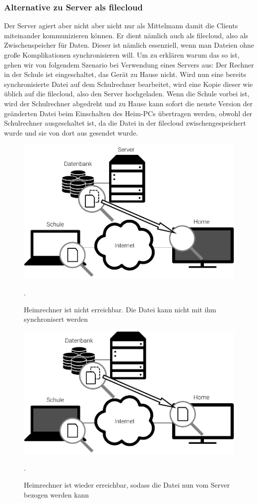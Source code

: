 \subsubsection{Alternative zu Server als \gls{filecloud}}
Der Server agiert aber nicht aber nicht nur als \glqq{} Mittelmann \grqq{} damit die
Clients miteinander kommunizieren können. Er dient nämlich auch als \gls{filecloud},
also als Zwischenspeicher für Daten. Dieser ist nämlich essenziell, wenn man
Dateien ohne große Komplikationen synchronisieren will. Um zu erklären warum das
so ist, gehen wir von folgendem Szenario bei Verwendung eines Servers aus:
Der Rechner in der Schule ist eingeschaltet, das Gerät zu Hause nicht. Wird nun
eine bereits synchronisierte Datei auf dem Schulrechner bearbeitet, wird eine Kopie dieser wie
üblich auf die \gls{filecloud}, also den Server hochgeladen. Wenn die Schule vorbei ist,
wird der Schulrechner abgedreht und zu Hause kann sofort die neuste Version der
geänderten  Datei beim Einschalten des Heim-PCs übertragen werden, obwohl der
Schulrechner ausgeschaltet ist, da die Datei in der \gls{filecloud}
zwischengespeichert wurde und sie von dort aus gesendet wurde.
\begin{figure}[h]
	\centering
  \includegraphics[]{images/dropbox_temp_1}
  \caption{Heimrechner ist nicht erreichbar. Die Datei kann nicht mit ihm
	synchronisert werden}.
\end{figure}
\begin{figure}[h]
	\centering
  \includegraphics[]{images/dropbox_temp_2}
  \caption{Heimrechner ist wieder erreichbar, sodass die Datei nun vom Server 
	bezogen werden kann}.
\end{figure}

